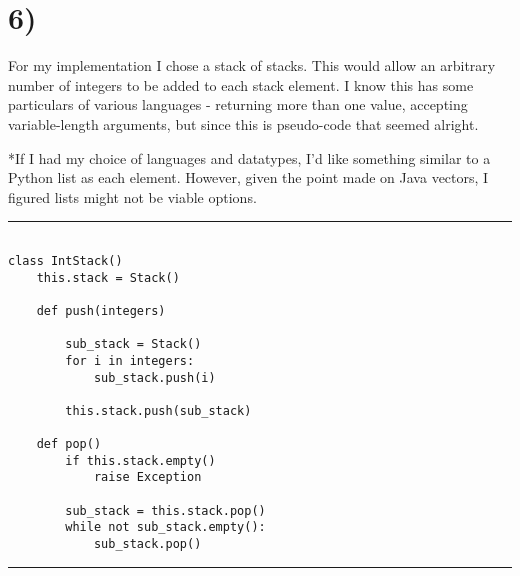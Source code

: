 \documentclass[a4paper,11pt]{article}
\begin{document}
\section*{6)}
For my implementation I chose a stack of stacks.  This would allow an arbitrary number of integers to be added to 
each stack element.  I know this has some particulars of various languages - returning more than one value, accepting variable-length arguments, but since this is pseudo-code that seemed alright.

*If I had my choice of languages and datatypes, I'd like something similar to a Python list as each element.  However, given the point made on Java vectors, I figured lists might not be viable options.

\noindent\rule{\linewidth}{0.1pt}
\begin{verbatim}

class IntStack()
    this.stack = Stack()
    
    def push(integers)
        
        sub_stack = Stack()
        for i in integers:
            sub_stack.push(i)
            
        this.stack.push(sub_stack)
        
    def pop()
        if this.stack.empty()
            raise Exception

        sub_stack = this.stack.pop()
        while not sub_stack.empty():
            sub_stack.pop()

\end{verbatim}
\noindent\rule{\linewidth}{0.1pt}

\end{document}
